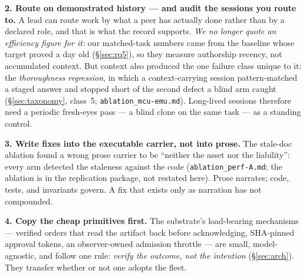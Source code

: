 \documentclass[10pt,conference]{IEEEtran}   %
\begin{document}
\textbf{2. Route on demonstrated history --- and audit the sessions you route to.} A lead can route
work by what a peer has actually done rather than by a declared role, and that is what the record
supports. \emph{We no longer quote an efficiency figure for it:} our matched-task numbers came from
the baseline whose target proved a day old (\S\ref{sec:rq5}), so they measure authorship recency, not
accumulated context. But context also
produced the one failure class unique to it: the \emph{thoroughness regression}, in which a
context-carrying session pattern-matched a staged answer and stopped short of the second defect
a blind arm caught (\S\ref{sec:taxonomy}, class~5; \texttt{ablation\_mcu-emu.md}). Long-lived
  sessions therefore need a periodic fresh-eyes pass ---
a blind clone on the same task --- as a standing control.

\textbf{3. Write fixes into the executable carrier, not into prose.} The stale-doc ablation
found a wrong prose carrier to be ``neither the asset nor the liability'': every arm detected
the staleness against the code (\texttt{ablation\_perf-A.md}; the ablation is in the
  replication package, not restated here). Prose narrates; code, tests, and invariants govern. A
fix that exists only as narration has not compounded.

\textbf{4. Copy the cheap primitives first.} The substrate's load-bearing mechanisms ---
verified orders that read the artifact back before acknowledging, SHA-pinned approval tokens,
an observer-owned admission throttle --- are small, model-agnostic, and follow one rule:
\emph{verify the outcome, not the intention} (\S\ref{sec:arch}). They transfer whether or not one adopts
the fleet.
\end{document}
